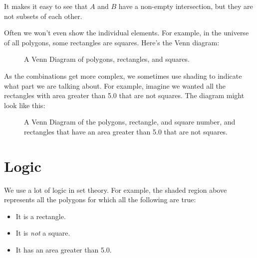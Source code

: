 It makes it easy to see that $A$ and $B$ have a non-empty
intersection, but they are not subsets of each other.

Often we won't even show the individual elements. For example, in the
universe of all polygons, some rectangles are squares. Here's the Venn diagram:
\begin{figure}[htbp]
    \centering
    \caption{A Venn Diagram of polygons, rectangles, and squares.}
    \label{fig:venn2}
\end{figure}

As the combinations get more complex, we sometimes use shading to
indicate what part we are talking about. For example, imagine we
wanted all the rectangles with area greater than 5.0 that are not
squares. The diagram might look like this:
\begin{figure}[htbp]
    \centering
    \caption{A Venn Diagram of the polygons, rectangle, and square number, and rectangles that have an area greater than 5.0 that are not squares.}
    \label{fig:venn3}
\end{figure}


\section{Logic}

We use a lot of logic in set theory.  For example, the shaded region
above represents all the polygons for which all the following are
true:
\begin{itemize}
\item It is a rectangle.
\item It is \textit{not} a square.
\item It has an area greater than 5.0.
\end{itemize}

